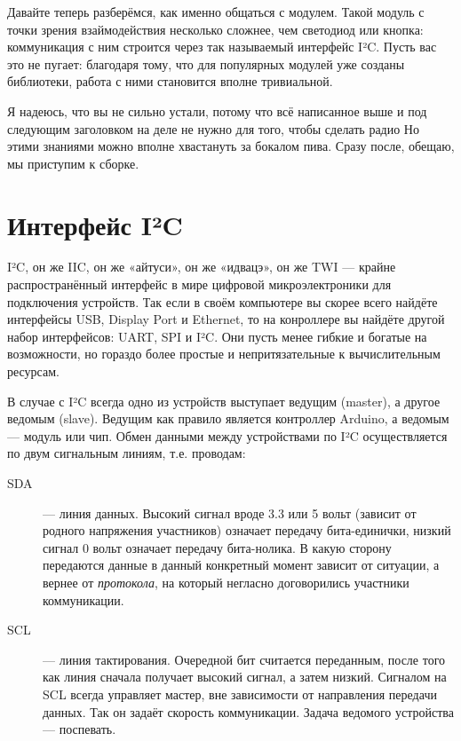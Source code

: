 Давайте теперь разберёмся, как именно общаться с модулем. Такой модуль с точки зрения взаймодействия несколько сложнее, чем светодиод или кнопка: коммуникация с ним строится через так называемый интерфейс I²C. Пусть вас это не пугает: благодаря тому, что для популярных модулей уже созданы библиотеки, работа с ними становится вполне тривиальной.

\begin{Note}
  Я надеюсь, что вы не сильно устали, потому что всё написанное выше и под следующим заголовком на деле не нужно для того, чтобы сделать радио  Но этими знаниями можно вполне хвастануть за бокалом пива. Сразу после, обещаю, мы приступим к сборке.
\end{Note}

\section{Интерфейс I²C}
\label{I2C}

I²C, он же IIC, он же «айтуси», он же «идвацэ», он же TWI — крайне распространённый интерфейс в мире цифровой микроэлектроники для подключения устройств. Так если в своём компьютере вы скорее всего найдёте интерфейсы USB, Display Port и Ethernet, то на конроллере вы найдёте другой набор интерфейсов: UART, SPI и I²C. Они пусть менее гибкие и богатые на возможности, но гораздо более простые и непритязательные к вычислительным ресурсам.

В случае с I²C всегда одно из устройств выступает ведущим (master), а другое ведомым (slave). Ведущим как правило является контроллер Arduino, а ведомым — модуль или чип. Обмен данными между устройствами по I²C осуществляется по двум сигнальным линиям, т.е. проводам:

\begin{description}
  \item [SDA] — линия данных. Высокий сигнал вроде 3.3 или 5 вольт (зависит от родного напряжения участников) означает передачу бита-единички, низкий сигнал 0 вольт означает передачу бита-нолика. В какую сторону передаются данные в данный конкретный момент зависит от ситуации, а вернее от \emph{протокола}, на который негласно договорились участники коммуникации.
  \item [SCL] — линия тактирования. Очередной бит считается переданным, после того как линия сначала получает высокий сигнал, а затем низкий. Сигналом на SCL всегда управляет мастер, вне зависимости от направления передачи данных. Так он задаёт скорость коммуникации. Задача ведомого устройства — поспевать.
\end{description}

